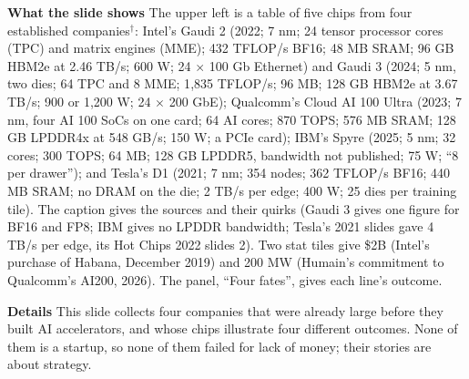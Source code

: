 \documentclass[11pt,letterpaper]{article}
\newcommand{\para}[1]{\medskip\noindent\textbf{#1}\quad}
\begin{document}
\para{What the slide shows} The upper left is a table of five chips from four established companies$^\dagger$: Intel's Gaudi 2 (2022; 7 nm; 24 tensor processor cores (TPC) and matrix engines (MME); 432 TFLOP/s BF16; 48 MB SRAM; 96 GB HBM2e at 2.46 TB/s; 600 W; 24 $\times$ 100 Gb Ethernet) and Gaudi 3 (2024; 5 nm, two dies; 64 TPC and 8 MME; 1{,}835 TFLOP/s; 96 MB; 128 GB HBM2e at 3.67 TB/s; 900 or 1{,}200 W; 24 $\times$ 200 GbE); Qualcomm's Cloud AI 100 Ultra (2023; 7 nm, four AI 100 SoCs on one card; 64 AI cores; 870 TOPS; 576 MB SRAM; 128 GB LPDDR4x at 548 GB/s; 150 W; a PCIe card); IBM's Spyre (2025; 5 nm; 32 cores; 300 TOPS; 64 MB; 128 GB LPDDR5, bandwidth not published; 75 W; ``8 per drawer''); and Tesla's D1 (2021; 7 nm; 354 nodes; 362 TFLOP/s BF16; 440 MB SRAM; no DRAM on the die; 2 TB/s per edge; 400 W; 25 dies per training tile). The caption gives the sources and their quirks (Gaudi 3 gives one figure for BF16 and FP8; IBM gives no LPDDR bandwidth; Tesla's 2021 slides gave 4 TB/s per edge, its Hot Chips 2022 slides 2). Two stat tiles give \$2B (Intel's purchase of Habana, December 2019) and 200 MW (Humain's commitment to Qualcomm's AI200, 2026). The panel, ``Four fates'', gives each line's outcome.

\para{Details} This slide collects four companies that were already large before they built AI accelerators, and whose chips illustrate four different outcomes. None of them is a startup, so none of them failed for lack of money; their stories are about strategy.
\end{document}
